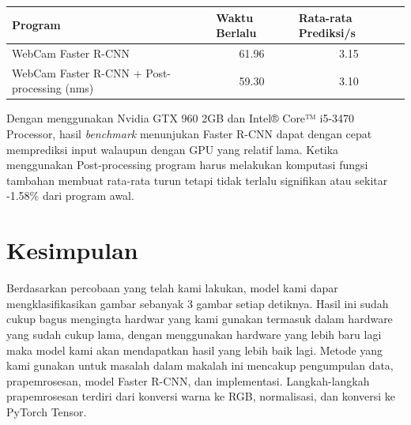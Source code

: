 \documentclass{article}
\begin{document}
  \begin{table}[H]
	\centering
	\begin{tabular}{lcc}
	\hline
	Program                                     & \multicolumn{1}{l}{Waktu Berlalu} & \multicolumn{1}{l}{Rata-rata Prediksi/s} \\ \hline
	WebCam Faster R-CNN                         & 61.96                             & 3.15                                     \\
	WebCam Faster R-CNN + Post-processing (nms) & 59.30                             & 3.10                                    
	\end{tabular}
	\end{table}

  Dengan menggunakan Nvidia GTX 960 2GB dan Intel® Core™ i5-3470 Processor, hasil \textit{benchmark} menunjukan Faster R-CNN dapat dengan cepat memprediksi input walaupun dengan GPU yang relatif lama. Ketika menggunakan Post-processing program harus melakukan komputasi fungsi tambahan membuat rata-rata turun tetapi tidak terlalu signifikan atau sekitar -1.58\% dari program awal. 

  \section{Kesimpulan}
  	\par Berdasarkan percobaan yang telah kami lakukan, model kami dapar mengklasifikasikan gambar sebanyak 3 gambar setiap detiknya. Hasil ini sudah cukup bagus mengingta hardwar yang kami gunakan termasuk dalam hardware yang sudah cukup lama, dengan menggunakan hardware yang lebih baru lagi maka model kami akan mendapatkan hasil yang lebih baik lagi. Metode yang kami gunakan untuk masalah dalam makalah ini mencakup pengumpulan data, prapemrosesan, model Faster R-CNN, dan implementasi. Langkah-langkah prapemrosesan terdiri dari konversi warna ke RGB, normalisasi, dan konversi ke PyTorch Tensor.
  	
\end{document}
